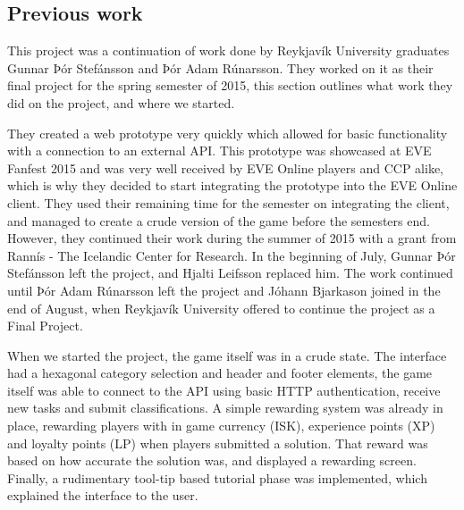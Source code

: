 \subsection{Previous work}
	This project was a continuation of work done by Reykjavík University graduates Gunnar Þór Stefánsson and Þór Adam Rúnarsson. They worked on it as their final project for the spring semester of 2015, this section outlines what work they did on the project, and where we started. 

	They created a web prototype very quickly which allowed for basic functionality with a connection to an external API. This prototype was showcased at EVE Fanfest 2015 and was very well received by EVE Online players and CCP alike, which is why they decided to start integrating the prototype into the EVE Online client. They used their remaining time for the semester on integrating the client, and managed to create a crude version of the game before the semesters end.
	However, they continued their work during the summer of 2015 with a grant from Rannís - The Icelandic Center for Research. In the beginning of July, Gunnar Þór Stefánsson left the project, and Hjalti Leifsson replaced him. The work continued until Þór Adam Rúnarsson left the project and Jóhann Bjarkason joined in the end of August, when Reykjavík University offered to continue the project as a Final Project.

	When we started the project, the game itself was in a crude state. The interface had a hexagonal category selection and header and footer elements, the game itself was able to connect to the API using basic HTTP authentication, receive new tasks and submit classifications. A simple rewarding system was already in place, rewarding players with in game currency (ISK), experience points (XP) and loyalty points (LP) when players submitted a solution. That reward was based on how accurate the solution was, and displayed a rewarding screen. Finally, a rudimentary tool-tip based tutorial phase was implemented, which explained the interface to the user.
